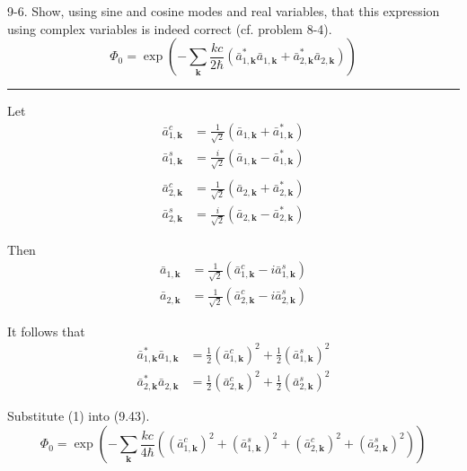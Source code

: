 \documentclass[12pt]{article}
\begin{document}
9-6.
Show, using sine and cosine modes and real variables,
that this expression using complex variables is indeed
correct (cf. problem 8-4).
\begin{equation*}
\Phi_0=\exp\left(
-\sum_{\mathbf k}
\frac{kc}{2\hbar}
\left(
\bar a_{1,\mathbf k}^*
\bar a_{1,\mathbf k}
+
\bar a_{2,\mathbf k}^*
\bar a_{2,\mathbf k}
\right)
\right)
\tag{9.43}
\end{equation*}

\bigskip
\hrule

\bigskip
Let
\begin{align*}
\bar a_{1,\mathbf k}^c&=\frac{1}{\sqrt2}(\bar a_{1,\mathbf k}+\bar a_{1,\mathbf k}^*)
\\
\bar a_{1,\mathbf k}^s&=\frac{i}{\sqrt2}(\bar a_{1,\mathbf k}-\bar a_{1,\mathbf k}^*)
\\
\\
\bar a_{2,\mathbf k}^c&=\frac{1}{\sqrt2}(\bar a_{2,\mathbf k}+\bar a_{2,\mathbf k}^*)
\\
\bar a_{2,\mathbf k}^s&=\frac{i}{\sqrt2}(\bar a_{2,\mathbf k}-\bar a_{2,\mathbf k}^*)
\end{align*}

Then
\begin{align*}
\bar a_{1,\mathbf k}&=\frac{1}{\sqrt2}(\bar a_{1,\mathbf k}^c-i\bar a_{1,\mathbf k}^s)
\\
\bar a_{2,\mathbf k}&=\frac{1}{\sqrt2}(\bar a_{2,\mathbf k}^c-i\bar a_{2,\mathbf k}^s)
\end{align*}

It follows that
\begin{equation*}
\begin{aligned}
\bar a_{1,\mathbf k}^*\bar a_{1,\mathbf k}
&=\frac{1}{2}(\bar a_{1,\mathbf k}^c)^2+\frac{1}{2}(\bar a_{1,\mathbf k}^s)^2
\\
\bar a_{2,\mathbf k}^*\bar a_{2,\mathbf k}
&=\frac{1}{2}(\bar a_{2,\mathbf k}^c)^2+\frac{1}{2}(\bar a_{2,\mathbf k}^s)^2
\end{aligned}
\tag{1}
\end{equation*}

Substitute (1) into (9.43).
\begin{equation*}
\Phi_0=\exp\left(
-\sum_{\mathbf k}
\frac{kc}{4\hbar}
\left(
(\bar a_{1,\mathbf k}^c)^2+(\bar a_{1,\mathbf k}^s)^2
+
(\bar a_{2,\mathbf k}^c)^2+(\bar a_{2,\mathbf k}^s)^2
\right)
\right)
\end{equation*}

\end{document}
